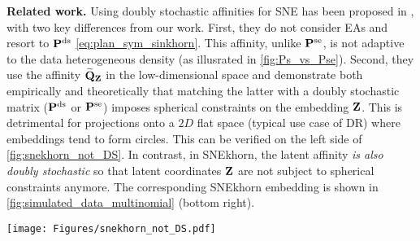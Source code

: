 \begin{minipage}{0.59\linewidth}
        \textbf{Related work.}
        Using doubly stochastic affinities for SNE has been proposed in \cite{lu2019doubly}, with two key differences from our work. First, they
        do not consider EAs and resort to $\mathbf{P}^{\mathrm{ds}}$ \eqref{eq:plan_sym_sinkhorn}. This affinity, unlike $\mathbf{P}^{\mathrm{se}}$, is not adaptive to the data heterogeneous density (as illusrated in \cref{fig:Ps_vs_Pse}). 
        Second, they use the affinity $\widetilde{\mathbf{Q}}_{\mathbf{Z}}$ in the low-dimensional space and demonstrate both empirically and theoretically that matching the latter with a doubly stochastic matrix (\eg $\mathbf{P}^{\mathrm{ds}}$ or $\mathbf{P}^{\mathrm{se}}$) imposes spherical constraints on the embedding $\mathbf{Z}$.
        This is detrimental for projections onto a $2D$ flat space (typical use case of DR) where embeddings tend to form circles. This can be verified on the left side of \cref{fig:snekhorn_not_DS}. In contrast, in SNEkhorn, the latent affinity \emph{is also doubly stochastic} so that latent coordinates $\mathbf{Z}$ are not subject to spherical constraints anymore.
        The corresponding SNEkhorn embedding is shown in \cref{fig:simulated_data_multinomial} (bottom right).
\end{minipage}
\hspace{0.005\linewidth}
\begin{minipage}{0.4\linewidth} 
\vspace{-0.2cm}
    \centerline{\texttt{[image: Figures/snekhorn\_not\_DS.pdf]}}
    \label{fig:snekhorn_not_DS}
\end{minipage}
